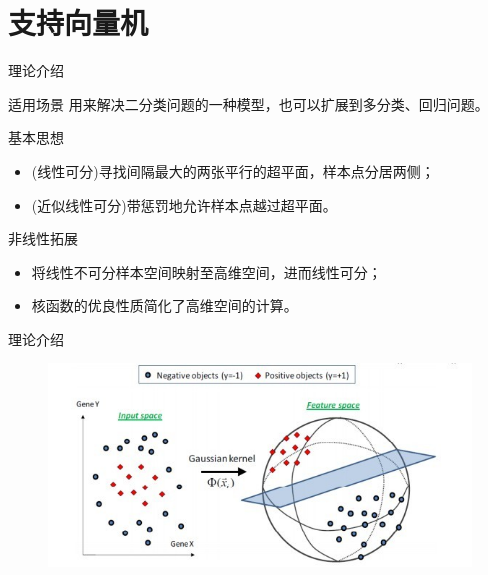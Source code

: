 \documentclass[11pt]{beamer}
\begin{document}
	\section{支持向量机}
	\begin{frame}{理论介绍}
		\begin{block}{适用场景}
			用来解决二分类问题的一种模型，也可以扩展到多分类、回归问题。
		\end{block}
		\begin{block}{基本思想}
			\begin{itemize}
				\item (线性可分)寻找间隔最大的两张平行的超平面，样本点分居两侧；
				\item (近似线性可分)带惩罚地允许样本点越过超平面。
			\end{itemize}
		\end{block}
		\begin{block}{非线性拓展}
			\begin{itemize}
				\item 将线性不可分样本空间映射至高维空间，进而线性可分；
				\item 核函数的优良性质简化了高维空间的计算。
			\end{itemize}
		\end{block}
	\end{frame}
	\begin{frame}{理论介绍}
		\begin{figure}[h]
			\centering
			\includegraphics[width=\linewidth]{img/线性不可分到线性可分}
		\end{figure}
	\end{frame}
\end{document}
